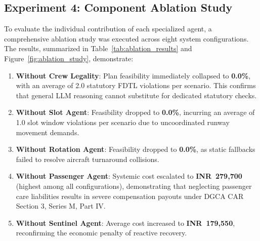 \subsection{Experiment 4: Component Ablation Study}
To evaluate the individual contribution of each specialized agent, a comprehensive ablation study was executed across eight system configurations. The results, summarized in Table~\ref{tab:ablation_results} and Figure~\ref{fig:ablation_study}, demonstrate:
\begin{enumerate}
    \item \textbf{Without Crew Legality}: Plan feasibility immediately collapsed to \textbf{0.0\%}, with an average of 2.0 statutory FDTL violations per scenario. This confirms that general LLM reasoning cannot substitute for dedicated statutory checks.
    \item \textbf{Without Slot Agent}: Feasibility dropped to \textbf{0.0\%}, incurring an average of 1.0 slot window violations per scenario due to uncoordinated runway movement demands.
    \item \textbf{Without Rotation Agent}: Feasibility dropped to \textbf{0.0\%}, as static fallbacks failed to resolve aircraft turnaround collisions.
    \item \textbf{Without Passenger Agent}: Systemic cost escalated to \textbf{INR~279,700} (highest among all configurations), demonstrating that neglecting passenger care liabilities results in severe compensation payouts under DGCA CAR Section 3, Series M, Part IV.
    \item \textbf{Without Sentinel Agent}: Average cost increased to \textbf{INR~179,550}, reconfirming the economic penalty of reactive recovery.
\end{enumerate}

